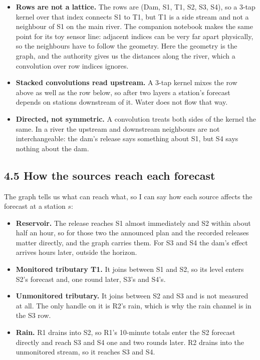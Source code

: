 \documentclass[11pt,letterpaper]{article}
\begin{document}
\begin{itemize}
\item \textbf{Rows are not a lattice.} The rows are (Dam, S1, T1, S2, S3, S4), so
a 3-tap kernel over that index connects S1 to T1, but T1 is a side stream and not
a neighbour of S1 on the main river. The companion notebook makes the same point
for its toy sensor line: adjacent indices can be very far apart physically, so the
neighbours have to follow the geometry. Here the geometry is the graph, and the
authority gives us the distances along the river, which a convolution over row
indices ignores.
\item \textbf{Stacked convolutions read upstream.} A 3-tap kernel mixes the row
above as well as the row below, so after two layers a station's forecast depends on
stations downstream of it. Water does not flow that way.
\item \textbf{Directed, not symmetric.} A convolution treats both sides of the
kernel the same. In a river the upstream and downstream neighbours are not
interchangeable: the dam's release says something about S1, but S4 says nothing
about the dam.
\end{itemize}

\subsection*{4.5 How the sources reach each forecast}

The graph tells us what can reach what, so I can say how each source affects the
forecast at a station $s$:

\begin{itemize}
\item \textbf{Reservoir.} The release reaches S1 almost immediately and S2 within
about half an hour, so for those two the announced plan and the recorded releases
matter directly, and the graph carries them. For S3 and S4 the dam's effect
arrives hours later, outside the horizon.
\item \textbf{Monitored tributary T1.} It joins between S1 and S2, so its level
enters S2's forecast and, one round later, S3's and S4's.
\item \textbf{Unmonitored tributary.} It joins between S2 and S3 and is not
measured at all. The only handle on it is R2's rain, which is why the rain channel
is in the S3 row.
\item \textbf{Rain.} R1 drains into S2, so R1's 10-minute totals enter the S2
forecast directly and reach S3 and S4 one and two rounds later. R2 drains into the
unmonitored stream, so it reaches S3 and S4.
\end{itemize}
\end{document}
